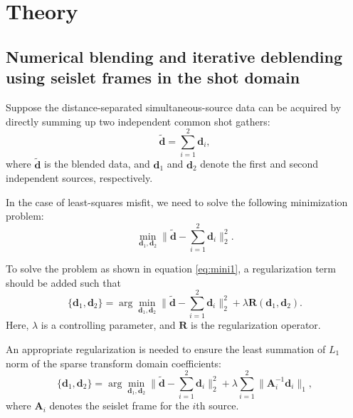 \section{Theory}
\subsection{Numerical blending and iterative deblending using seislet frames in the shot domain}
Suppose the distance-separated simultaneous-source data can be acquired by directly summing up two independent common shot gathers:
\begin{equation}
\label{eq:sum}
\tilde{\mathbf{d}}=\sum_{i=1}^{2}\mathbf{d}_i,
\end{equation}
where $\tilde{\mathbf{d}}$ is the blended data, and $\mathbf{d}_1$ and $\mathbf{d}_2$ denote the first and second independent sources, respectively.

In the case of least-squares misfit, we need to solve the following minimization problem:
\begin{equation}
\label{eq:mini1}
\min_{\mathbf{d}_1,\mathbf{d}_2}  \parallel\tilde{\mathbf{d}} - \sum_{i=1}^{2}\mathbf{d}_i \parallel_2^2.
\end{equation}

To solve the problem as shown in equation \ref{eq:mini1}, a regularization term should be added such that
\begin{equation}
\label{eq:mini2}
\{\mathbf{d}_1,\mathbf{d}_2\} = \arg \min_{\mathbf{d}_1,\mathbf{d}_2} \parallel\tilde{\mathbf{d}} - \sum_{i=1}^{2}\mathbf{d}_i \parallel_2^2 + \lambda\mathbf{R}(\mathbf{d}_1,\mathbf{d}_2).
\end{equation}
Here, $\lambda$ is a controlling parameter, and $\mathbf{R}$ is the regularization operator.

An appropriate regularization is needed to ensure the least summation of $L_1$ norm of the sparse transform domain coefficients:
\begin{equation}
\label{eq:mini2}
\{\mathbf{d}_1,\mathbf{d}_2\} = \arg \min_{\mathbf{d}_1,\mathbf{d}_2} \parallel\tilde{\mathbf{d}} - \sum_{i=1}^{2}\mathbf{d}_i \parallel_2^2 + \lambda\sum_{i=1}^{2} \parallel \mathbf{A}_i^{-1}\mathbf{d}_i\parallel_1,
\end{equation}
where $\mathbf{A}_i$ denotes the seislet frame for the $i$th source.


